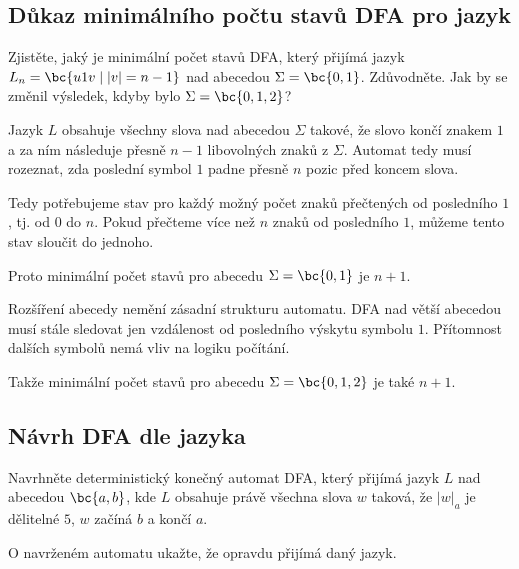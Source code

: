 
\subsection{Důkaz minimálního počtu stavů DFA pro jazyk}
Zjistěte, jaký je minimální počet stavů DFA, který přijímá jazyk $L_n = \bc{u1v \mid |v|=n-1}$ nad abecedou
$\Sigma = \bc{0,1}$. Zdůvodněte. Jak by se změnil výsledek, kdyby bylo $\Sigma = \bc{0,1,2}$?

Jazyk $L$ obsahuje všechny slova nad abecedou $\Sigma$ takové, že slovo končí znakem $1$ a za ním následuje přesně $n-1$
libovolných znaků z $\Sigma$. Automat tedy musí rozeznat, zda poslední symbol $1$ padne přesně $n$ pozic před koncem
slova.

Tedy potřebujeme stav pro každý možný počet znaků přečtených od posledního $1$, tj. od 0 do $n$. Pokud přečteme více než
$n$ znaků od posledního $1$, můžeme tento stav sloučit do jednoho.

Proto minimální počet stavů pro abecedu $\Sigma = \bc{0,1}$ je $n+1$.

Rozšíření abecedy nemění zásadní strukturu automatu. DFA nad větší abecedou musí stále sledovat jen vzdálenost od
posledního výskytu symbolu $1$. Přítomnost dalších symbolů nemá vliv na logiku počítání.

Takže minimální počet stavů pro abecedu $\Sigma = \bc{0,1,2}$ je také $n+1$.

\subsection{Návrh DFA dle jazyka}
Navrhněte deterministický konečný automat DFA, který přijímá jazyk $L$ nad abecedou $\bc{a,b}$, kde $L$ obsahuje právě
všechna slova $w$ taková, že $|w|_a$ je dělitelné $5$, $w$ začíná $b$ a končí $a$.

\noindent
O navrženém automatu ukažte, že opravdu přijímá daný jazyk.

